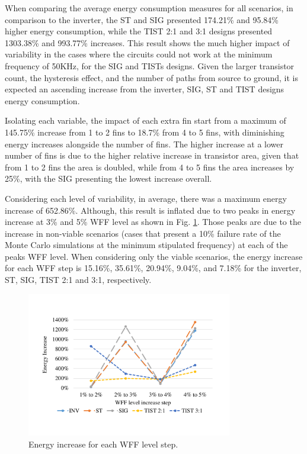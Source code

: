 \documentclass[pgmicro,diss,english]{iiufrgs}
\begin{document}
When comparing the average energy consumption measures for all scenarios, in comparison to the inverter, the ST and SIG presented 174.21\% and 95.84\% higher energy consumption, while the TIST 2:1 and 3:1 designs presented 1303.38\% and 993.77\% increases. This result shows the much higher impact of variability in the cases where the circuits could not work at the minimum frequency of 50KHz, for the SIG and TISTs designs. Given the larger transistor count, the hysteresis effect, and the number of paths from source to ground, it is expected an ascending increase from the inverter, SIG, ST and TIST designs energy consumption.

Isolating each variable, the impact of each extra fin start from a maximum of 145.75\% increase from 1 to 2 fins to 18.7\% from 4 to 5 fins, with diminishing energy increases alongside the number of fins. The higher increase at a lower number of fins is due to the higher relative increase in transistor area, given that from 1 to 2 fins the area is doubled, while from 4 to 5 fins the area increases by 25\%, with the SIG presenting the lowest increase overall.

Considering each level of variability, in average, there was a maximum energy increase of 652.86\%. Although, this result is inflated due to two peaks in energy increase at 3\% and 5\% WFF level as shown in Fig. \ref{fig:energyWFFstep}. Those peaks are due to the increase in non-viable scenarios (cases that present a 10\% failure rate of the Monte Carlo simulations at the minimum stipulated frequency) at each of the peaks WFF level. When considering only the viable scenarios, the energy increase for each WFF step is 15.16\%, 35.61\%, 20.94\%, 9.04\%, and 7.18\% for the inverter, ST, SIG, TIST 2:1 and 3:1, respectively.

\begin{figure}[h]
	\centering
		\includegraphics[width=0.8\textwidth, trim={2cm 3cm 2cm 3cm}, clip]{energyIncreaseWFFstep.pdf}
		\caption{Energy increase for each WFF level step.}
	\label{fig:energyWFFstep}
\end{figure}
\end{document}
